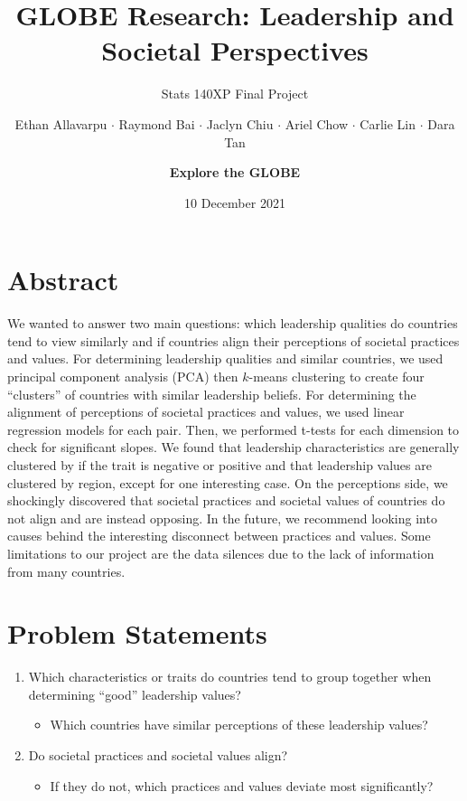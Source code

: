 \documentclass[
]{article}
\title{GLOBE Research: Leadership and Societal Perspectives}
\subtitle{Stats 140XP Final Project}
\author{Ethan Allavarpu \(\cdot\) Raymond Bai \(\cdot\) Jaclyn Chiu
\(\cdot\) Ariel Chow \(\cdot\) Carlie Lin \(\cdot\) Dara
Tan \and \textbf{Explore the GLOBE}}
\date{10 December 2021}
\providecommand{\tightlist}{%
  \setlength{\itemsep}{0pt}\setlength{\parskip}{0pt}}
\begin{document}
\maketitle

{
\setcounter{tocdepth}{1}
\tableofcontents
}
\newpage

\hypertarget{abstract}{%
\section{Abstract}\label{abstract}}

We wanted to answer two main questions: which leadership qualities do
countries tend to view similarly and if countries align their
perceptions of societal practices and values. For determining leadership
qualities and similar countries, we used principal component analysis
(PCA) then \(k\)-means clustering to create four ``clusters'' of
countries with similar leadership beliefs. For determining the alignment
of perceptions of societal practices and values, we used linear
regression models for each pair. Then, we performed t-tests for each
dimension to check for significant slopes. We found that leadership
characteristics are generally clustered by if the trait is negative or
positive and that leadership values are clustered by region, except for
one interesting case. On the perceptions side, we shockingly discovered
that societal practices and societal values of countries do not align
and are instead opposing. In the future, we recommend looking into
causes behind the interesting disconnect between practices and values.
Some limitations to our project are the data silences due to the lack of
information from many countries.

\hypertarget{problem-statements}{%
\section{Problem Statements}\label{problem-statements}}

\begin{enumerate}
\def\labelenumi{\arabic{enumi}.}
\tightlist
\item
  Which characteristics or traits do countries tend to group together
  when determining ``good'' leadership values?

  \begin{itemize}
  \tightlist
  \item
    Which countries have similar perceptions of these leadership values?
  \end{itemize}
\item
  Do societal practices and societal values align?

  \begin{itemize}
  \tightlist
  \item
    If they do not, which practices and values deviate most
    significantly?
  \end{itemize}
\end{enumerate}
\end{document}

